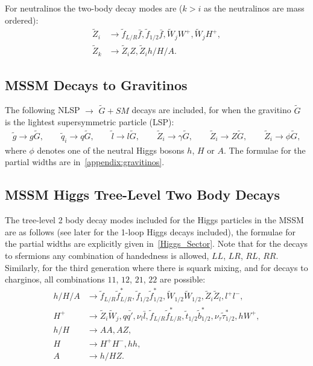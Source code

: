 \documentclass[final,3p,times,pdflatex]{elsarticle}
\begin{document}
For neutralinos the two-body decay modes are ($k>i$ as the neutralinos
are mass ordered): 
\begin{align*}
\tilde{Z}_{i} &\rightarrow \tilde{f}_{L/R} \bar{f}, \tilde{f}_{1/2} \bar{f}, \tilde{W}_{j} W^+, \tilde{W}_{j} H^+,\\
\tilde{Z}_{k} &\rightarrow \tilde{Z}_{i} Z, \tilde{Z}_i h/H/A.
\end{align*}

\subsection{MSSM Decays to Gravitinos}
The following NLSP $\rightarrow$ $\tilde{G} + SM$ decays are included,
for when the gravitino $\tilde{G}$ is the lightest supersymmetric particle
(LSP):
\begin{align*}
\tilde{g} \rightarrow g \tilde{G}, \qquad
\tilde{q}_{i} \rightarrow q \tilde{G}, \qquad
\tilde{l} \rightarrow l \tilde{G}, \qquad
\tilde{Z}_{i} \rightarrow \gamma \tilde{G}, \qquad
\tilde{Z}_{i} \rightarrow Z \tilde{G}, \qquad
\tilde{Z}_{i} \rightarrow \phi \tilde{G},
\end{align*}
where $\phi$ denotes one of the neutral Higgs bosons $h$, $H$ or $A$.
The formulae for the partial widths are in~\ref{appendix:gravitinos}.

\subsection{MSSM Higgs Tree-Level Two Body Decays}
The tree-level 2 body decay modes included for the Higgs particles in the
MSSM are as follows (see later for the 1-loop Higgs decays included), the
formulae for the partial widths are explicitly given in~\ref{Higgs_Sector}. Note that for the decays to sfermions any combination of handedness
is allowed, $LL$, $LR$, $RL$, $RR$. Similarly, for the third generation where
there is squark mixing, and for decays to charginos, all combinations $11$,
$12$, $21$, $22$ are possible: 
\begin{align*}
h/H/A &\rightarrow \tilde{f}_{L/R} \tilde{f}_{L/R}^*, \tilde{f}_{1/2} \tilde{f}_{1/2}^*, \tilde{W}_{1/2} \tilde{W}_{1/2}, \tilde{Z}_{i} \tilde{Z}_{l}, l^+ l^-, \\
H^+ &\rightarrow \tilde{Z}_{i} \tilde{W}_{j}, q \bar{q'}, \nu_{l} \bar{l}, \tilde{f}_{L/R} \tilde{f}_{L/R}^*, \tilde{t}_{1/2} \tilde{b}_{1/2}^*, \nu_{\tau} \tilde{\tau}_{1/2}^*, h W^+,\\
h/H &\rightarrow A A, A Z, \\
H &\rightarrow H^+ H^-, hh, \\
A &\rightarrow h/H Z.
\end{align*}
\end{document}
